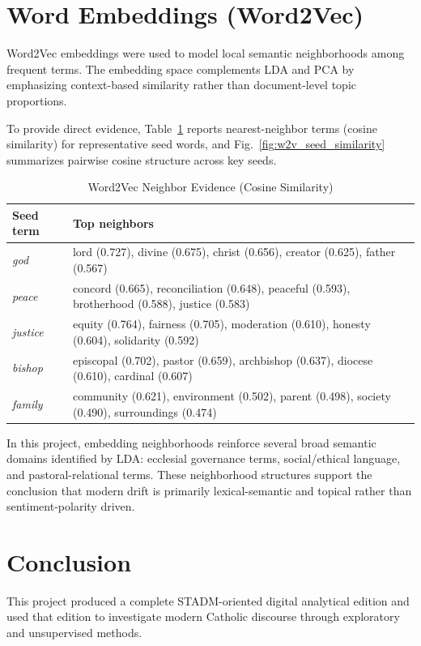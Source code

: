 \documentclass[conference]{IEEEtran}
\begin{document}
\section{Word Embeddings (Word2Vec)}
Word2Vec embeddings were used to model local semantic neighborhoods among frequent terms. The embedding space complements LDA and PCA by emphasizing context-based similarity rather than document-level topic proportions.

To provide direct evidence, Table~\ref{tab:w2v_neighbors} reports nearest-neighbor terms (cosine similarity) for representative seed words, and Fig.~\ref{fig:w2v_seed_similarity} summarizes pairwise cosine structure across key seeds.

\begin{table}[htbp]
\caption{Word2Vec Neighbor Evidence (Cosine Similarity)}
\label{tab:w2v_neighbors}
\centering
\footnotesize
\begin{tabular}{lp{}}
\toprule
Seed term & Top neighbors \\
\midrule
\textit{god} & lord (0.727), divine (0.675), christ (0.656), creator (0.625), father (0.567) \\
\textit{peace} & concord (0.665), reconciliation (0.648), peaceful (0.593), brotherhood (0.588), justice (0.583) \\
\textit{justice} & equity (0.764), fairness (0.705), moderation (0.610), honesty (0.604), solidarity (0.592) \\
\textit{bishop} & episcopal (0.702), pastor (0.659), archbishop (0.637), diocese (0.610), cardinal (0.607) \\
\textit{family} & community (0.621), environment (0.502), parent (0.498), society (0.490), surroundings (0.474) \\
\bottomrule
\end{tabular}
\end{table}

In this project, embedding neighborhoods reinforce several broad semantic domains identified by LDA: ecclesial governance terms, social/ethical language, and pastoral-relational terms. These neighborhood structures support the conclusion that modern drift is primarily lexical-semantic and topical rather than sentiment-polarity driven.

\section{Conclusion}
This project produced a complete STADM-oriented digital analytical edition and used that edition to investigate modern Catholic discourse through exploratory and unsupervised methods.
\end{document}
